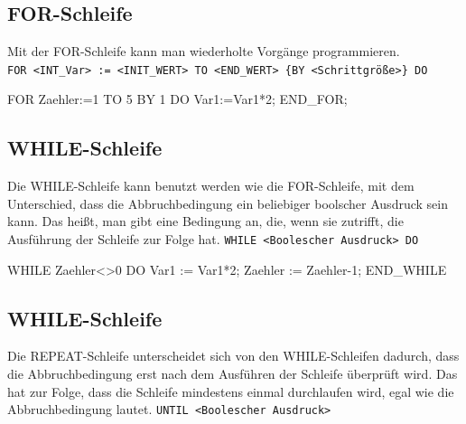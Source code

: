 \documentclass[
  10pt,
  a4paper,
]{article}
\newenvironment{Shaded}{}{}
\newcommand{\NormalTok}[1]{\textcolor[rgb]{0.14,0.16,0.18}{#1}}
\numberwithin{equation}{section}
\begin{document}
\hypertarget{for-schleife}{%
\subsection{FOR-Schleife}\label{for-schleife}}

Mit der FOR-Schleife kann man wiederholte Vorgänge programmieren.
\texttt{FOR\ \textless{}INT\_Var\textgreater{}\ :=\ \textless{}INIT\_WERT\textgreater{}\ TO\ \textless{}END\_WERT\textgreater{}\ \{BY\ \textless{}Schrittgröße\textgreater{}\}\ DO}

\begin{Shaded}
\begin{Highlighting}[]
\NormalTok{FOR Zaehler:=1 TO 5 BY 1 DO}
\NormalTok{    Var1:=Var1*2;}
\NormalTok{END\_FOR;}
\end{Highlighting}
\end{Shaded}

\hypertarget{while-schleife}{%
\subsection{WHILE-Schleife}\label{while-schleife}}

Die WHILE-Schleife kann benutzt werden wie die FOR-Schleife, mit dem
Unterschied, dass die Abbruchbedingung ein beliebiger boolscher Ausdruck
sein kann. Das heißt, man gibt eine Bedingung an, die, wenn sie
zutrifft, die Ausführung der Schleife zur Folge hat.
\texttt{WHILE\ \textless{}Boolescher\ Ausdruck\textgreater{}\ DO}

\begin{Shaded}
\begin{Highlighting}[]
\NormalTok{WHILE Zaehler\textless{}\textgreater{}0 DO}
\NormalTok{    Var1 := Var1*2;}
\NormalTok{    Zaehler := Zaehler{-}1;}
\NormalTok{END\_WHILE}
\end{Highlighting}
\end{Shaded}

\hypertarget{while-schleife-1}{%
\subsection{WHILE-Schleife}\label{while-schleife-1}}

Die REPEAT-Schleife unterscheidet sich von den WHILE-Schleifen dadurch,
dass die Abbruchbedingung erst nach dem Ausführen der Schleife überprüft
wird. Das hat zur Folge, dass die Schleife mindestens einmal durchlaufen
wird, egal wie die Abbruchbedingung lautet.
\texttt{UNTIL\ \textless{}Boolescher\ Ausdruck\textgreater{}}
\end{document}
